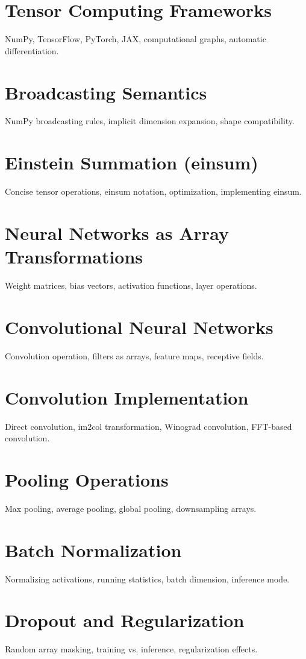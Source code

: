 \chapter{Tensor Computing Frameworks}
NumPy, TensorFlow, PyTorch, JAX, computational graphs, automatic differentiation.

\chapter{Broadcasting Semantics}
NumPy broadcasting rules, implicit dimension expansion, shape compatibility.

\chapter{Einstein Summation (einsum)}
Concise tensor operations, einsum notation, optimization, implementing einsum.

\chapter{Neural Networks as Array Transformations}
Weight matrices, bias vectors, activation functions, layer operations.

\chapter{Convolutional Neural Networks}
Convolution operation, filters as arrays, feature maps, receptive fields.

\chapter{Convolution Implementation}
Direct convolution, im2col transformation, Winograd convolution, FFT-based convolution.

\chapter{Pooling Operations}
Max pooling, average pooling, global pooling, downsampling arrays.

\chapter{Batch Normalization}
Normalizing activations, running statistics, batch dimension, inference mode.

\chapter{Dropout and Regularization}
Random array masking, training vs. inference, regularization effects.

